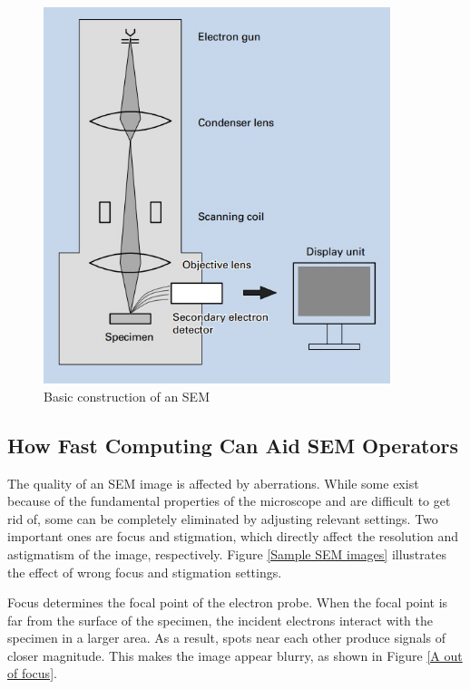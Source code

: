\documentclass{article}
\begin{document}
\begin{figure}
    \centering
    \includegraphics[width=0.9\textwidth]{Images/SEM basic construction.jpg}
    \caption{Basic construction of an SEM \cite{SEM A to Z}}
    \label{SEM basic construction}
\end{figure}

\subsection{How Fast Computing Can Aid SEM Operators}
The quality of an SEM image is affected by aberrations. While some exist because of the fundamental properties of the microscope and are difficult to get rid of, some can be completely eliminated by adjusting relevant settings. Two important ones are focus and stigmation, which directly affect the resolution and astigmatism of the image, respectively. Figure \ref{Sample SEM images} illustrates the effect of wrong focus and stigmation settings.

Focus determines the focal point of the electron probe. When the focal point is far from the surface of the specimen, the incident electrons interact with the specimen in a larger area. As a result, spots near each other produce signals of closer magnitude. This makes the image appear blurry, as shown in Figure \ref{A out of focus}.
\end{document}
